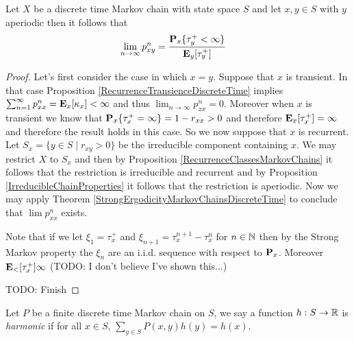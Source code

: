 \begin{prop}Let $X$ be a discrete time Markov chain with state space
  $S$ and let $x,y \in S$ with $y$ aperiodic then it follows that
\begin{align*}
\lim_{n \to \infty} p^n_{xy} &= \frac{\sprobability{\tau^+_y < \infty}{x}}{\sexpectation{\tau^+_y}{y}}
\end{align*}
\end{prop}
\begin{proof}
Let's first consider the case in which $x=y$.  Suppose that $x$ is
transient.  In that case Proposition
\ref{RecurrenceTransienceDiscreteTime} implies $\sum_{n=1}^\infty
p^n_{xx} = \sexpectation{\kappa_x}{x} < \infty$ and thus
$\lim_{n\to \infty} p^n_{xx} = 0$.  Moreover when $x$ is transient we
know that $\sprobability{\tau^+_x = \infty}{x} = 1-r_{xx} > 0$ and
therefore $\sexpectation{\tau^+_x}{x} = \infty$ and therefore the
result holds in this case.  So we now suppose that $x$ is recurrent.
Let $S_x = \lbrace y \in S \mid r_{xy} > 0 \rbrace$ be the irreducible
component containing $x$.  We may restrict $X$ to $S_x$ and then by
Proposition \ref{RecurrenceClassesMarkovChains} it follows that the
restriction is irreducible and recurrent and by Proposition
\ref{IrreducibleChainProperties} it follows that the restriction is
aperiodic.  Now we may apply Theorem
\ref{StrongErgodicityMarkovChainsDiscreteTime} to conclude that $\lim
p^n_{xx}$ exists.

Note that if we let $\xi_1 = \tau^+_x$ and $\xi_{n+1} = \tau^{n+1}_x -
\tau^{n}_x$ for $n \in \naturals$ then by the Strong Markov property
the $\xi_n$ are an i.i.d. sequence with respect to
$\probabilityop_x$.  Moreover $\sexpectation{\tau^+_x} < \infty$
(TODO: I don't believe I've shown this...)

TODO:  Finish
\end{proof}

\begin{defn}Let $P$ be a finite discrete time Markov chain on $S$, we say a function
  $h : S \to \reals$ is \emph{harmonic} if for all $x \in S$, $\sum_{y
    \in S} P(x,y) h(y) = h(x)$.
\end{defn}


